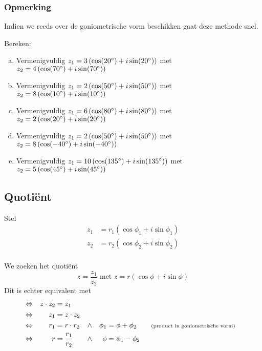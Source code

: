 \documentclass[12pt,twoside,a4]{article}
\begin{document}
\subsubsection*{Opmerking}

Indien we reeds over de goniometrische vorm beschikken gaat deze methode snel.

\begin{oefening}
Bereken:
\begin{enumerate}[(a)]
  \itemsep.5em
  \item Vermenigvuldig $z_1=3\left(\cos(20^\circ)+i\sin(20^\circ)\right)$ met $z_2=4\left(\cos(70^\circ)+i\sin(70^\circ)\right)$
  \item Vermenigvuldig $z_1=2\left(\cos(50^\circ)+i\sin(50^\circ)\right)$ met $z_2=8\left(\cos(10^\circ)+i\sin(10^\circ)\right)$
  \item Vermenigvuldig $z_1=6\left(\cos(80^\circ)+i\sin(80^\circ)\right)$ met $z_2=2\left(\cos(20^\circ)+i\sin(20^\circ)\right)$
  \item Vermenigvuldig $z_1=2\left(\cos(50^\circ)+i\sin(50^\circ)\right)$ met $z_2=8\left(\cos(-40^\circ)+i\sin(-40^\circ)\right)$
  \item Vermenigvuldig $z_1=10\left(\cos(135^\circ)+i\sin(135^\circ)\right)$ met $z_2=5\left(\cos(45^\circ)+i\sin(45^\circ)\right)$
\end{enumerate}
\end{oefening}

\subsection{Quotiënt}

Stel
\begin{align*}
  z_1 &= r_1 ( \cos \phi_1 + i \sin \phi_1 )\\
  z_2 &= r_2 ( \cos \phi_2 + i \sin \phi_2 )\\
\end{align*}

We zoeken het quotiënt
\[z=\dfrac{z_1}{z_2} \mbox{ met } z=r(\cos \phi + i\sin \phi)\]
Dit is echter equivalent met
\begin{align*}
  &\Leftrightarrow& z \cdot z_2 &= z_1\\
  &\Leftrightarrow& z_1 &= z \cdot z_2\\
  &\Leftrightarrow& r_1 &= r \cdot r_2          &\wedge&&  \phi_1 &= \phi + \phi_2 \qquad \mbox{\scriptsize(product in goniometrische vorm)}\\
  &\Leftrightarrow&   r &= \dfrac{r_1}{r_2} &\wedge&&  \phi &= \phi_1 - \phi_2\\
\end{align*}
\end{document}
